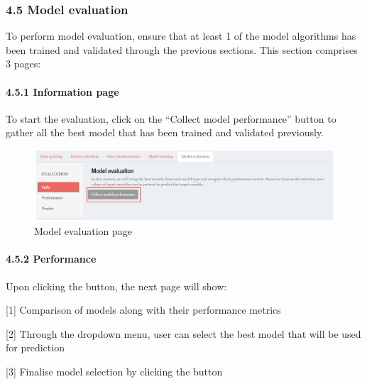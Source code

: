 \documentclass[
  12pt,
]{article}
\begin{document}
\hypertarget{model-evaluation}{%
\subsubsection{4.5 Model evaluation}\label{model-evaluation}}

To perform model evaluation, ensure that at least 1 of the model
algorithms has been trained and validated through the previous sections.
This section comprises 3 pages:

\hypertarget{information-page}{%
\paragraph{4.5.1 Information page}\label{information-page}}

To start the evaluation, click on the ``Collect model performance''
button to gather all the best model that has been trained and validated
previously.

\begin{figure}[H]

{\centering \includegraphics[width=0.95\linewidth]{images/mdleval1} 

}

\caption{Model evaluation page}\label{fig:unnamed-chunk-26}
\end{figure}

\hypertarget{performance}{%
\paragraph{4.5.2 Performance}\label{performance}}

Upon clicking the button, the next page will show:

{[}1{]} Comparison of models along with their performance metrics

{[}2{]} Through the dropdown menu, user can select the best model that
will be used for prediction

{[}3{]} Finalise model selection by clicking the button
\end{document}
